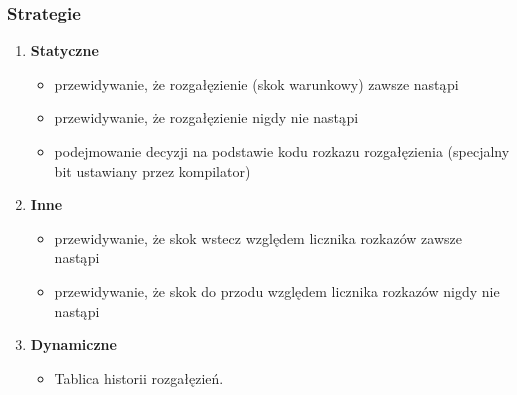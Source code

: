    		\subsubsection{Strategie}
	   	\begin{enumerate}
	   		\item \textbf{Statyczne}
	   		\begin{itemize}
	   			\item przewidywanie, że rozgałęzienie (skok warunkowy) zawsze nastąpi
	   			\item przewidywanie, że rozgałęzienie nigdy nie nastąpi
	   			\item podejmowanie decyzji na podstawie kodu rozkazu rozgałęzienia (specjalny bit ustawiany przez kompilator)
	   		\end{itemize}
	   		\item \textbf{Inne}
	   		\begin{itemize}
	   			\item przewidywanie, że skok wstecz względem licznika rozkazów zawsze nastąpi
	   			\item przewidywanie, że skok do przodu względem licznika rozkazów nigdy nie nastąpi
	   		\end{itemize}
	   		\item \textbf{Dynamiczne}
	   		\begin{itemize}
	   			\item Tablica historii rozgałęzień.
	   		\end{itemize}
	   	\end{enumerate}
